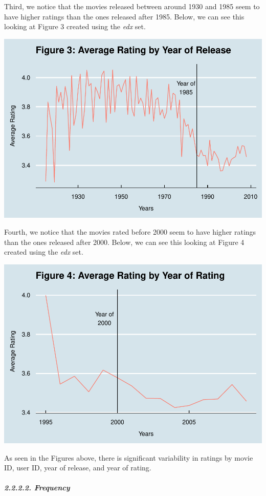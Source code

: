 \documentclass[
]{article}
\begin{document}
Third, we notice that the movies released between around 1930 and 1985
seem to have higher ratings than the ones released after 1985. Below, we
can see this looking at Figure 3 created using the \emph{edx} set.

\begin{center}\includegraphics[width=0.75\linewidth,height=0.5\textheight]{MovieLens_Project_files/figure-latex/Figure 3 - Average Rating by Year of Release-1} \end{center}

Fourth, we notice that the movies rated before 2000 seem to have higher
ratings than the ones released after 2000. Below, we can see this
looking at Figure 4 created using the \emph{edx} set.

\begin{center}\includegraphics[width=0.75\linewidth,height=0.5\textheight]{MovieLens_Project_files/figure-latex/Figure 4 - Average Rating by Year of Rating-1} \end{center}

As seen in the Figures above, there is significant variability in
ratings by movie ID, user ID, year of release, and year of rating.

\hypertarget{frequency}{%
\subparagraph{2.2.2.2. Frequency}\label{frequency}}
\end{document}

